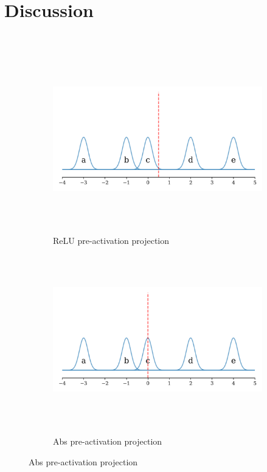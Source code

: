 \section{Discussion}

\begin{figure}[ht]
    \centering

    \begin{subfigure}[b]{0.49\textwidth}
    \centering
    \includegraphics[width=\textwidth]{images/activation_demo_relu_pre}
    \caption{ReLU pre-activation projection}
    \label{fig:relu_pre}
    \end{subfigure}
    \hfill
    \begin{subfigure}[b]{0.49\textwidth}
    \centering
    \includegraphics[width=\textwidth]{images/activation_demo_abs_pre}
    \caption{Abs pre-activation projection}
    \label{fig:abs_pre}
    \end{subfigure}


\end{figure}
